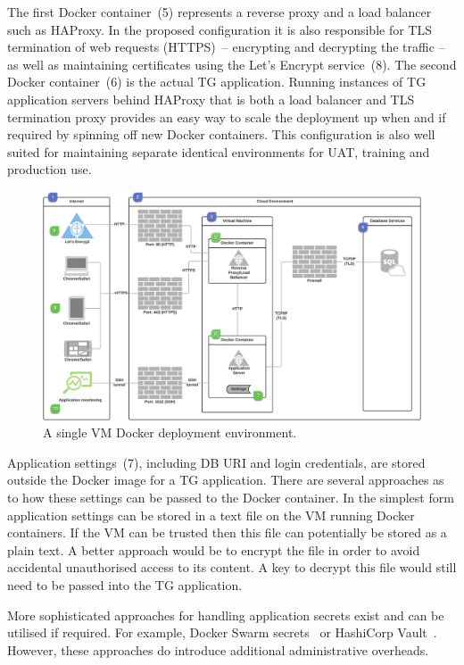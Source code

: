 \documentclass[a4paper,12pt,oneside,openright]{memoir}
\begin{document}
	The first Docker container~(5) represents a reverse proxy and a load balancer such as HAProxy.
	In the proposed configuration it is also responsible for TLS termination of web requests (HTTPS)~-- encrypting and decrypting the traffic -- as well as maintaining certificates using the Let's Encrypt service~(8).
	The second Docker container~(6) is the actual TG application.
	Running instances of TG application servers behind HAProxy that is both a load balancer and TLS termination proxy provides an easy way to scale the deployment up when and if required by spinning off new Docker containers.
	This configuration is also well suited for maintaining separate identical environments for UAT, training and production use.

	\begin{figure}[h!tbp]
	\centering
	\includegraphics[width=\linewidth]{images/12-more-detailed-security-diagram.png}
	\caption{A single VM Docker deployment environment.}\label{sec:04:fig:1}
	\end{figure}

	Application settings~(7), including DB URI and login credentials, are stored outside the Docker image for a TG application.
	There are several approaches as to how these settings can be passed to the Docker container.
	In the simplest form application settings can be stored in a text file on the VM running Docker containers.
	If the VM can be trusted then this file can potentially be stored as a plain text.
	A better approach would be to encrypt the file in order to avoid accidental unauthorised access to its content.
	A key to decrypt this file would still need to be passed into the TG application.

	More sophisticated approaches for handling application secrets exist and can be utilised if required.
	For example, Docker Swarm secrets~\cite{DSS} or HashiCorp Vault~\cite{HCV}.
	However, these approaches do introduce additional administrative overheads.
\end{document}
